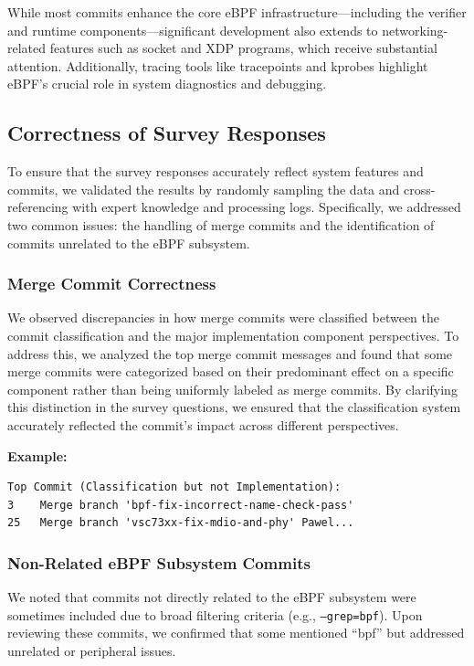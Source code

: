 While most commits enhance the core eBPF infrastructure—including the verifier and runtime components—significant development also extends to networking-related features such as socket and XDP programs, which receive substantial attention. Additionally, tracing tools like tracepoints and kprobes highlight eBPF's crucial role in system diagnostics and debugging.

\subsection{Correctness of Survey Responses}

To ensure that the survey responses accurately reflect system features and commits, we validated the results by randomly sampling the data and cross-referencing with expert knowledge and processing logs. Specifically, we addressed two common issues: the handling of merge commits and the identification of commits unrelated to the eBPF subsystem.

\subsubsection{Merge Commit Correctness}

We observed discrepancies in how merge commits were classified between the commit classification and the major implementation component perspectives. To address this, we analyzed the top merge commit messages and found that some merge commits were categorized based on their predominant effect on a specific component rather than being uniformly labeled as merge commits. By clarifying this distinction in the survey questions, we ensured that the classification system accurately reflected the commit's impact across different perspectives.

\textbf{Example:}
\begin{verbatim}
Top Commit (Classification but not Implementation):
3    Merge branch 'bpf-fix-incorrect-name-check-pass'
25   Merge branch 'vsc73xx-fix-mdio-and-phy' Pawel...
\end{verbatim}

\subsubsection{Non-Related eBPF Subsystem Commits}

We noted that commits not directly related to the eBPF subsystem were sometimes included due to broad filtering criteria (e.g., \texttt{--grep=bpf}). Upon reviewing these commits, we confirmed that some mentioned ``bpf'' but addressed unrelated or peripheral issues.

